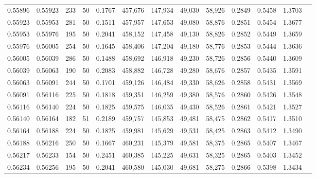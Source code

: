 \begin{tabular}{rrrrrrrrrrrrr}
0.55896 & 0.55923 &   233 &  50 &                                     0.1767 & 457,676 & 147,934 &  49,030 &  58,926 & 0.2849 & 0.5458 & 1.3703 \\
0.55923 & 0.55953 &   281 &  50 &                                     0.1511 & 457,957 & 147,653 &  49,080 &  58,876 & 0.2851 & 0.5454 & 1.3677 \\
0.55953 & 0.55976 &   195 &  50 &                                     0.2041 & 458,152 & 147,458 &  49,130 &  58,826 & 0.2852 & 0.5449 & 1.3659 \\
0.55976 & 0.56005 &   254 &  50 &                                     0.1645 & 458,406 & 147,204 &  49,180 &  58,776 & 0.2853 & 0.5444 & 1.3636 \\
0.56005 & 0.56039 &   286 &  50 &                                     0.1488 & 458,692 & 146,918 &  49,230 &  58,726 & 0.2856 & 0.5440 & 1.3609 \\
0.56039 & 0.56063 &   190 &  50 &                                     0.2083 & 458,882 & 146,728 &  49,280 &  58,676 & 0.2857 & 0.5435 & 1.3591 \\
0.56063 & 0.56091 &   244 &  50 &                                     0.1701 & 459,126 & 146,484 &  49,330 &  58,626 & 0.2858 & 0.5431 & 1.3569 \\
0.56091 & 0.56116 &   225 &  50 &                                     0.1818 & 459,351 & 146,259 &  49,380 &  58,576 & 0.2860 & 0.5426 & 1.3548 \\
0.56116 & 0.56140 &   224 &  50 &                                     0.1825 & 459,575 & 146,035 &  49,430 &  58,526 & 0.2861 & 0.5421 & 1.3527 \\
0.56140 & 0.56164 &   182 &  51 &                                     0.2189 & 459,757 & 145,853 &  49,481 &  58,475 & 0.2862 & 0.5417 & 1.3510 \\
0.56164 & 0.56188 &   224 &  50 &                                     0.1825 & 459,981 & 145,629 &  49,531 &  58,425 & 0.2863 & 0.5412 & 1.3490 \\
0.56188 & 0.56216 &   250 &  50 &                                     0.1667 & 460,231 & 145,379 &  49,581 &  58,375 & 0.2865 & 0.5407 & 1.3467 \\
0.56217 & 0.56233 &   154 &  50 &                                     0.2451 & 460,385 & 145,225 &  49,631 &  58,325 & 0.2865 & 0.5403 & 1.3452 \\
0.56234 & 0.56256 &   195 &  50 &                                     0.2041 & 460,580 & 145,030 &  49,681 &  58,275 & 0.2866 & 0.5398 & 1.3434 \\

\end{tabular}
